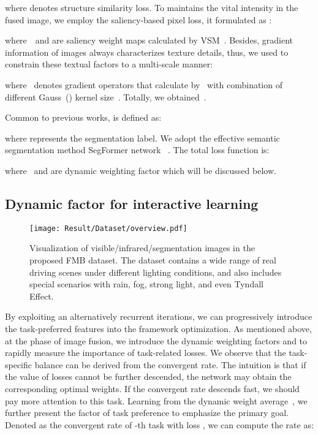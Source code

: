\documentclass[10pt,twocolumn,letterpaper]{article}
\begin{document}
where  denotes structure similarity loss.  To maintains the vital intensity in the fused image, we employ the saliency-based pixel loss, it formulated as :

where~~and  are saliency weight maps calculated by VSM~\cite{ma20171123}. Besides, gradient information of images always characterizes texture details, thus, we used  to constrain these textual factors to a multi-scale manner:

where~ denotes gradient operators that calculate by ~with combination of different Gauss~() kernel size~. 
Totally, we obtained~.

Common to previous works,  is defined as:
 
where  represents the segmentation label. We adopt the effective semantic segmentation method SegFormer network ~\cite{xie2021segformer}. The total loss function is:

where~ and  are dynamic weighting factor which will be discussed below.

\subsection{Dynamic factor for interactive learning}


\begin{figure*}[!htb]
	\centering
	\setlength{\tabcolsep}{1pt} 
	
	\texttt{[image: Result/Dataset/overview.pdf]}
	
	\caption{Visualization of visible/infrared/segmentation images in the proposed FMB dataset. The dataset contains a wide range of real driving scenes under different lighting conditions, and also includes special scenarios with rain, fog, strong light, and even Tyndall Effect.}
	\label{fig:sample}
	\vspace{-0.5cm}  
\end{figure*}


By exploiting an alternatively recurrent iterations, we can progressively introduce the task-preferred features into the framework optimization. As mentioned above, at the phase of image fusion, we introduce the dynamic weighting factors  and  to rapidly measure the importance of task-related losses. We observe that the task-specific balance can be derived from the convergent rate.  The intuition is that if the value of losses cannot be further descended, the network may obtain the corresponding optimal weights. If the convergent rate descends fast, we should pay more attention to this task. Learning from the dynamic weight average~\cite{liu2019end}, we further present the factor of task preference  to emphasize the primary goal. Denoted  as the convergent rate of -th task with loss , we can compute the rate as:
\end{document}

